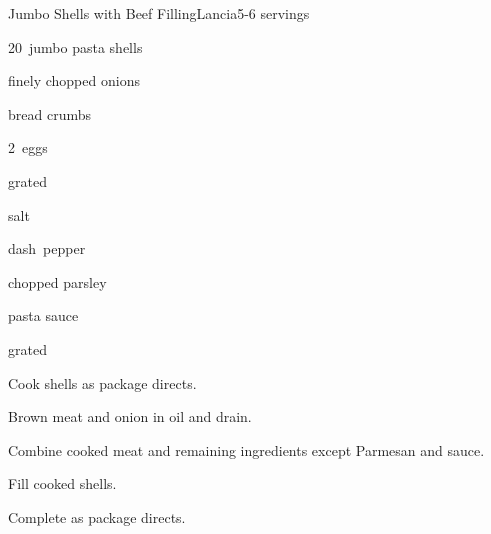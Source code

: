 \begin{recipe}{Jumbo Shells with Beef Filling}{Lancia}{5-6 servings}

\begin{ingredients}
\item 20~jumbo pasta shells
\item {} 
\item \C{\quarter} finely chopped onions
\item \C{\quarter} bread crumbs
\item 2~eggs
\item {} grated 
\item \tp{\half} salt
\item dash~pepper
\item {} chopped parsley
\item \C{3\half} pasta sauce
\item \C{\quarter} grated 
\end{ingredients}

\begin{directions}
\item Cook shells as package directs.
\item Brown meat and onion in oil and drain.
\item Combine cooked meat and remaining ingredients except Parmesan and sauce.
\item Fill cooked shells.
\item Complete as package directs.
\end{directions}

\end{recipe}
